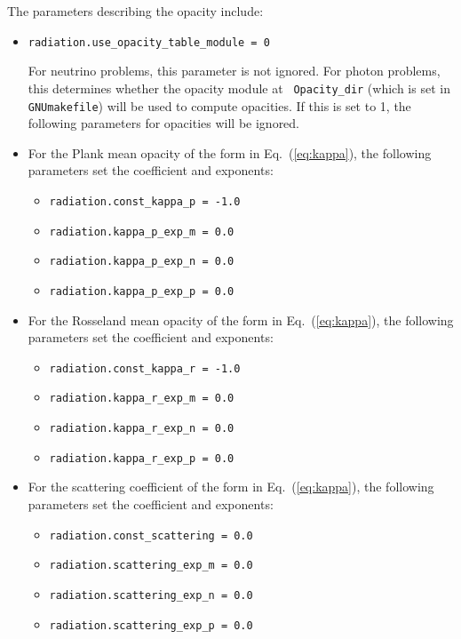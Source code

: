 \documentclass[11pt,letterpaper]{article}
\begin{document}
The parameters describing the opacity include:
\begin{itemize}

\item {\tt radiation.use\_opacity\_table\_module = 0}
  
  For neutrino problems, this parameter is not ignored.  For photon
  problems, this determines whether the opacity module at {\tt
    Opacity\_dir} (which is set in {\tt GNUmakefile}) will be used to
  compute opacities.  If this is set to 1, the following parameters
  for opacities will be ignored.

\item For the Plank mean opacity of the form in Eq.~(\ref{eq:kappa}),
  the following parameters set the coefficient and exponents:
  \begin{itemize}
  \item {\tt radiation.const\_kappa\_p = -1.0}
  \item {\tt radiation.kappa\_p\_exp\_m = 0.0}
  \item {\tt radiation.kappa\_p\_exp\_n = 0.0}
  \item {\tt radiation.kappa\_p\_exp\_p = 0.0}
  \end{itemize}

\item For the Rosseland mean opacity of the form in Eq.~(\ref{eq:kappa}),
  the following parameters set the coefficient and exponents:
  \begin{itemize}
  \item {\tt radiation.const\_kappa\_r = -1.0}
  \item {\tt radiation.kappa\_r\_exp\_m = 0.0}
  \item {\tt radiation.kappa\_r\_exp\_n = 0.0}
  \item {\tt radiation.kappa\_r\_exp\_p = 0.0}
  \end{itemize}
  
\item For the scattering coefficient of the form in Eq.~(\ref{eq:kappa}),
  the following parameters set the coefficient and exponents:
  \begin{itemize}
  \item {\tt radiation.const\_scattering = 0.0}
  \item {\tt radiation.scattering\_exp\_m = 0.0}
  \item {\tt radiation.scattering\_exp\_n = 0.0}
  \item {\tt radiation.scattering\_exp\_p = 0.0}
  \end{itemize}


\end{itemize}
\end{document}
